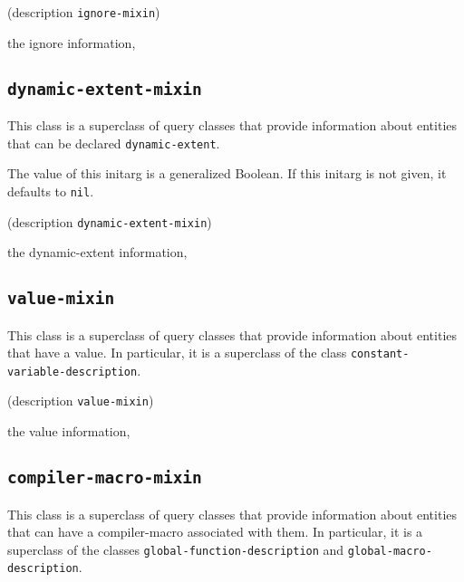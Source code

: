 {\footnotesize
{} {(description {\tt ignore-mixin})}
}

 the ignore information, 

\subsection{\texttt{dynamic-extent-mixin}}
\label{sec-dynamic-extent-mixin}

{\footnotesize
{}
}

This class is a superclass of query classes that provide information
about entities that can be declared \texttt{dynamic-extent}.

{\footnotesize
{}
}

The value of this initarg is a generalized Boolean.  If this initarg
is not given, it defaults to \texttt{nil}.

{\footnotesize
{} {(description {\tt dynamic-extent-mixin})}
}

 the dynamic-extent information, 

\subsection{\texttt{value-mixin}}
\label{sec-value-mixin}

{\footnotesize
{}
}

This class is a superclass of query classes that provide information
about entities that have a value.  In particular, it is a superclass
of the class \texttt{constant-variable-description}.

{\footnotesize
{}
}

{\footnotesize
{} {(description {\tt value-mixin})}
}

 the value information, 

\subsection{\texttt{compiler-macro-mixin}}
\label{sec-compiler-macro-mixin}

{\footnotesize
{}
}

This class is a superclass of query classes that provide information
about entities that can have a compiler-macro associated with them.
In particular, it is a superclass of the classes
\texttt{global-function-description} and
\texttt{global-macro-description}.

